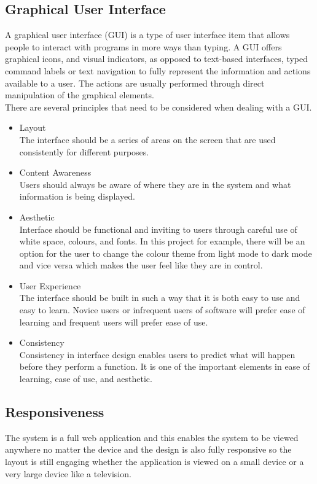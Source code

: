 \documentclass[twoside, a4paper, 12pt]{report}
\begin{document}
\subsection{Graphical User Interface}
A graphical user interface (GUI) is a type of user interface item that allows people to interact with programs in more ways than typing. A GUI offers graphical icons, and visual indicators, as opposed to text-based interfaces, typed command labels or text navigation to fully represent the information and actions available to a user. The actions are usually performed through direct manipulation of the graphical elements.\\
\indent
There are several principles that need to be considered when dealing with a GUI.
\begin{itemize}
\item Layout\\
The interface should be a series of areas on the screen that are used consistently for different purposes.
\item Content Awareness\\
Users should always be aware of where they are in the system and what information is being displayed.
\item Aesthetic\\
Interface should be functional and inviting to users through careful use of white space, colours, and fonts. In this project for example, there will be an option for the user to change the colour theme from light mode to dark mode and vice versa which makes the user feel like they are in control.
\item User Experience\\
The interface should be built in such a way that it is both easy to use and easy to learn. Novice users or infrequent users of software will prefer ease of learning and frequent users will prefer ease of use.
\item Consistency\\
Consistency in interface design enables users to predict what will happen before they perform a function. It is one of the important elements in ease of learning, ease of use, and aesthetic.
\end{itemize}

\subsection{Responsiveness}
The system is a full web application and this enables the system to be viewed anywhere no matter the device and the design is also fully responsive so the layout is still engaging whether the application is viewed on a small device or a very large device like a television. 
\end{document}
